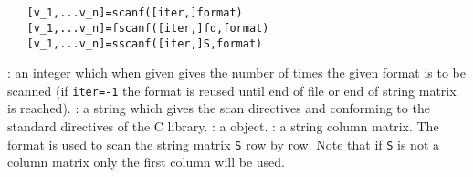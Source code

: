 
\begin{mandesc}
  \\
  \\
\end{mandesc}
\label{scanf}
\begin{calling_sequence}
\begin{verbatim}
   [v_1,...v_n]=scanf([iter,]format)
   [v_1,...v_n]=fscanf([iter,]fd,format)
   [v_1,...v_n]=sscanf([iter,]S,format)
\end{verbatim}
\end{calling_sequence}

\begin{parameters}
  \begin{varlist}
    : an integer which when given gives the number of times the given 
    format is to be scanned (if \verb+iter=-1+ the format is reused until end of file or 
    end of string matrix is reached).
    : a string which gives the scan directives and conforming to the 
    standard directives of the C library.
    : a  object.
    : a string column matrix. 
    The format is used to scan the string matrix \verb+S+ row by row. Note that 
    if \verb+S+ is not a column matrix only the first column will be used. 
  \end{varlist}
\end{parameters}

